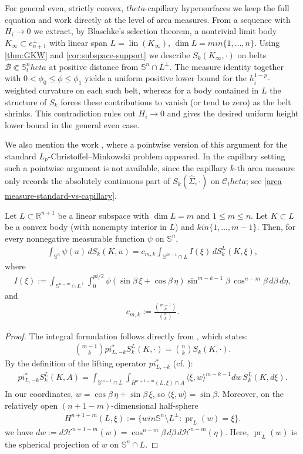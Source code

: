 \documentclass[12pt]{amsart}
\def\theta{theta}%
\def\pi{pi}%
\def\in{in }%
\numberwithin{equation}{section}
\newcommand{\wh}{\widehat}
\newcommand{\bbS}{\mathbb{S}}
\newcommand{\8}{\infty}
\newcommand{\cB}{\mathcal{B}}
\newcommand{\cC}{\mathcal{C}}
\newcommand{\cH}{\mathcal{H}}
\newcommand{\eq}[1]{\begin{equation}\begin{alignedat}{2}#1\end{alignedat}\end{equation}}
\newcommand{\Cth}{\cC_\theta}
\begin{document}
For general even, strictly convex, $\theta$-capillary hypersurfaces we keep the full equation and work directly at the level of area measures. From a sequence with $H_i\to 0$ we extract, by Blaschke's selection theorem, a nontrivial limit body $K_\infty\subset e_{n+1}^\perp$ with linear span $L=\operatorname{lin}(K_\infty)$, $\dim L=m\in\{1,\dots,n\}$. Using \autoref{thm:GKW} and \autoref{cor:subspace-support} we describe $S_k(K_\infty,\cdot)$ on belts $\cB\Subset\mathbb{S}^n_\theta$ at positive distance from $\mathbb{S}^n\cap L^\perp$. The measure identity together with $0<\phi_0\le\phi\le\phi_1$ yields a uniform positive lower bound for the $h_i^{1-p}$-weighted curvature on each such belt, whereas for a body contained in $L$ the structure of $S_k$ forces these contributions to vanish (or tend to zero) as the belt shrinks. This contradiction rules out $H_i\to 0$ and gives the desired uniform height lower bound in the general even case.

We also mention the work \cite{PS24}, where a pointwise version of this argument for the standard $L_p$-Christoffel--Minkowski problem appeared. In the capillary setting such a pointwise argument is not available, since the capillary $k$-th area measure only records the absolutely continuous part of $S_k(\wh{\Sigma},\cdot)$ on $\Cth$; see \autoref{area measure-standard-vs-capillary}.


\begin{thm}\label{thm:GKW}
Let $L \subset \mathbb{R}^{n+1}$ be a linear subspace with $\dim L = m$ and $1 \le m \le n$. Let $K \subset L$ be a convex body (with nonempty interior in $L$) and $k \in \{1, \dots, m-1\}$. Then, for every nonnegative measurable function $\psi$ on $\mathbb{S}^n$,
\eq{
\int_{\mathbb{S}^n} \psi(u) \, dS_k(K, u) = c_{m,k} \int_{\mathbb{S}^{m-1} \cap L} I(\xi) \, dS_k^L(K, \xi),
}
where
\eq{
I(\xi) := \int_{\mathbb{S}^{n-m} \cap L^\perp} \int_{0}^{\pi/2} \psi(\sin\beta\,\xi+\cos\beta\,\eta ) \sin^{m-k-1}\beta \, \cos^{n-m}\beta \, d\beta \, d\eta,
}
and
\eq{
c_{m,k} := \frac{\binom{m-1}{k}}{\binom{n}{k}}.
}
\end{thm}

\begin{proof}
The integral formulation follows directly from \cite[Thm. 6.2]{GKW11}, which states:
\eq{
\binom{m-1}{k} \pi_{L,-k}^* S_k^L(K, \cdot) = \binom{n}{k} S_k(K, \cdot).
}
By the definition of the lifting operator $\pi_{L,-k}^*$ (cf. \cite[Def. 5.2]{GKW11}):
\eq{
\pi_{L,-k}^* S_k^L(K, A) = \int_{\mathbb{S}^{m-1} \cap L} \int_{H^{n+1-m}(L,\xi) \cap A} \langle \xi, w \rangle^{m-k-1} dw \, S_k^L(K, d\xi).
}
In our coordinates, $w = \cos\beta\,\eta + \sin\beta\,\xi$, so $\langle \xi, w \rangle = \sin\beta$. Moreover, on the relatively open $(n+1-m)$-dimensional half-sphere
\eq{
H^{n+1-m}(L,\xi)
:=\bigl\{ w\in \mathbb{S}^{n}\setminus L^\perp: \operatorname{pr}_L(w)=\xi\bigr\}.
}
we have $dw := d\cH^{n+1-m}(w)=\cos^{n-m}\beta \, d\beta \, d\cH^{n-m}(\eta)$. Here, $\operatorname{pr}_L(w)$ is the spherical projection of $w$ on $\bbS^n\cap L$.
\end{proof}
\end{document}
